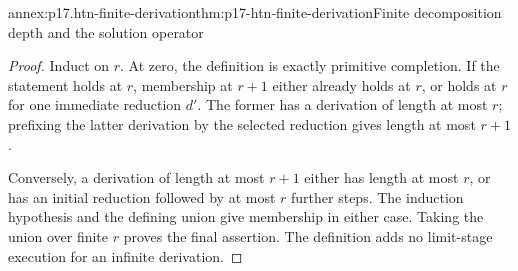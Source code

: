 
\begin{annexitem}{annex:p17.htn-finite-derivation}{thm:p17-htn-finite-derivation}{Finite decomposition depth and the solution operator}
\begin{proof}
Induct on \(r\). At zero, the definition is exactly primitive completion.
If the statement holds at \(r\), membership at \(r+1\) either already holds
at \(r\), or holds at \(r\) for one immediate reduction \(d'\). The former
has a derivation of length at most \(r\); prefixing the latter derivation by
the selected reduction gives length at most \(r+1\).

Conversely, a derivation of length at most \(r+1\) either has length at most
\(r\), or has an initial reduction followed by at most \(r\) further steps.
The induction hypothesis and the defining union give membership in either
case. Taking the union over finite \(r\) proves the final assertion. The
definition adds no limit-stage execution for an infinite derivation.
\end{proof}
\end{annexitem}

